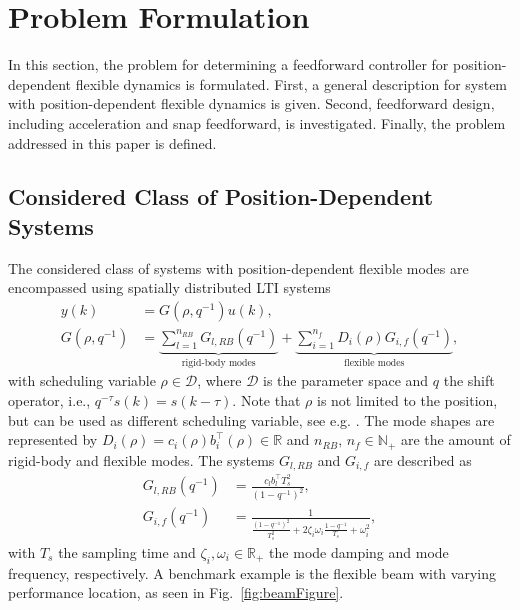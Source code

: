 \documentclass[letterpaper, 10 pt, conference]{ieeeconf}  %
\newcounter{example}
\begin{document}
\section{Problem Formulation}
\label{sec:problemFormulation}
In this section, the problem for determining a feedforward controller for position-dependent flexible dynamics is formulated. First, a general description for system with position-dependent flexible dynamics is given. Second, feedforward design, including acceleration and snap feedforward, is investigated. Finally, the problem addressed in this paper is defined.
\subsection{Considered Class of Position-Dependent Systems}
The considered class of systems with position-dependent flexible modes are encompassed using spatially distributed LTI systems \cite[Section~3.2]{wodek2004,Moheimani2003}
\begin{equation}
	\label{eq:LPVTF}
	\begin{split}
		y(k) &= G(\rho,q^{-1})u(k), \\
		G(\rho,q^{-1}) &= \underbrace{\sum_{l=1}^{n_{RB}}G_{l,RB}(q^{-1})}_{\text{rigid-body modes}}+\underbrace{\sum_{i=1}^{n_f}D_i(\rho)G_{i,f}(q^{-1})}_{\text{flexible modes}},
	\end{split}
\end{equation}
with scheduling variable $\rho\in\mathcal{D}$, where $\mathcal{D}$ is the parameter space and $q$ the shift operator, i.e., $q^{-\tau}s(k)=s(k-\tau)$. Note that $\rho$ is not limited to the position, but can be used as different scheduling variable, see e.g. \cite[Fig.~7]{Abramovitch2015}. The mode shapes are represented by $D_i(\rho)=c_i(\rho)b_i^\top(\rho) \in \mathbb{R}$ and $n_{RB},\, n_{f}\in\mathbb{N}_+$ are the amount of rigid-body and flexible modes. The systems $G_{l,RB}$ and $G_{i,f}$ are described as \cite{wodek2004}
\begin{equation}
	\begin{split}
		G_{l,RB}(q^{-1}) &= \frac{c_lb_l^\top T_s^2}{(1-q^{-1})^2}, \\
		G_{i,f}(q^{-1}) &= \frac{1}{\frac{(1-q^{-1})^2}{T_s^2}+2\zeta_i\omega_i\frac{1-q^{-1}}{T_s}+\omega_i^2},
	\end{split}
\end{equation}
with $T_s$ the sampling time and $\zeta_i,\omega_i \in\mathbb{R}_+$ the mode damping and mode frequency, respectively. A benchmark example is the flexible beam with varying performance location, as seen in Fig.~\ref{fig:beamFigure}. \par
\end{document}
